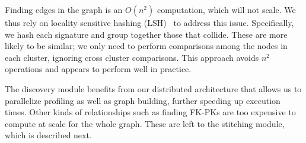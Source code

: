 Finding edges in the graph is an $O(n^2)$ computation, which will not scale.  We thus rely on locality sensitive hashing (LSH)~\cite{DBLP:conf/compgeom/DatarIIM04} to address this issue. Specifically, we hash each signature and group together those that collide.  These are more likely to be similar; we only need to perform comparisons among the nodes in each cluster, ignoring cross cluster comparisons.  This approach avoids $n^2$ operations and appears to perform well in practice.


The discovery module benefits from our distributed architecture that allows us to parallelize profiling as well as graph building, further speeding up execution times. Other kinds of relationships such as finding FK-PKs are too expensive to compute at scale for the whole graph.  These are left to the stitching module, which is described next. 


